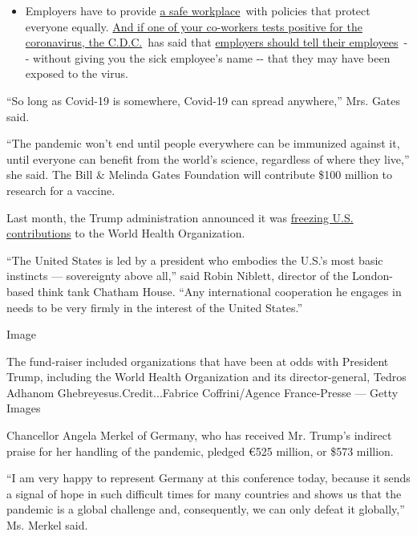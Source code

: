 \begin{itemize}
  \begin{itemize}
  \tightlist
  \item
    Employers have to provide
    \href{https://www.osha.gov/SLTC/covid-19/standards.html}{a safe
    workplace}~with policies that protect everyone equally.
    \href{https://www.nytimes3xbfgragh.onion/article/coronavirus-money-unemployment.html?action=click\&pgtype=Article\&state=default\&region=MAIN_CONTENT_3\&context=storylines_faq}{And
    if one of your co-workers tests positive for the coronavirus, the
    C.D.C.}~has said that
    \href{https://www.cdc.gov/coronavirus/2019-ncov/community/guidance-business-response.html}{employers
    should tell their employees}~-\/- without giving you the sick
    employee's name -\/- that they may have been exposed to the virus.
  \end{itemize}
\end{itemize}

``So long as Covid-19 is somewhere, Covid-19 can spread anywhere,'' Mrs.
Gates said.

``The pandemic won't end until people everywhere can be immunized
against it, until everyone can benefit from the world's science,
regardless of where they live,'' she said. The Bill \& Melinda Gates
Foundation will contribute \$100 million to research for a vaccine.

Last month, the Trump administration announced it was
\href{https://www.nytimes3xbfgragh.onion/2020/04/15/us/politics/trump-coronavirus-who.html}{freezing
U.S. contributions} to the World Health Organization.

``The United States is led by a president who embodies the U.S.'s most
basic instincts --- sovereignty above all,'' said Robin Niblett,
director of the London-based think tank Chatham House. ``Any
international cooperation he engages in needs to be very firmly in the
interest of the United States.''

Image

The fund-raiser included organizations that have been at odds with
President Trump, including the World Health Organization and its
director-general, Tedros Adhanom Ghebreyesus.Credit...Fabrice
Coffrini/Agence France-Presse --- Getty Images

Chancellor Angela Merkel of Germany, who has received Mr. Trump's
indirect praise for her handling of the pandemic, pledged €525 million,
or \$573 million.

``I am very happy to represent Germany at this conference today, because
it sends a signal of hope in such difficult times for many countries and
shows us that the pandemic is a global challenge and, consequently, we
can only defeat it globally,'' Ms. Merkel said.

